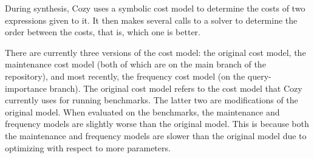 During synthesis, Cozy uses a symbolic cost model to determine the costs of two
expressions given to it. It then makes several calls to a solver to determine
the order between the costs, that is, which one is better.

There are currently three versions of the cost model: the original cost model,
the maintenance cost model (both of which are on the main branch of the
repository), and most recently, the frequency cost model (on the
query-importance branch).  The original cost model refers to the cost model that
Cozy currently uses for running benchmarks. The latter two are modifications of
the original model.  When evaluated on the benchmarks, the maintenance and
frequency models are slightly worse than the original model. This is because
both the maintenance and frequency models are slower than the original model due
to optimizing with respect to more parameters.
